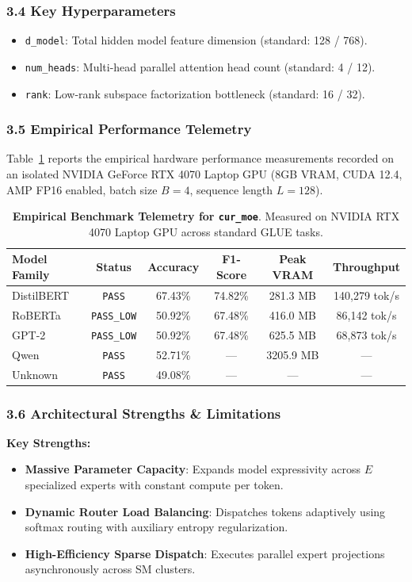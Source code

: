 \subsubsection*{3.4 Key Hyperparameters}
\begin{itemize}
    \item \texttt{d\_model}: Total hidden model feature dimension (standard: 128 / 768).
    \item \texttt{num\_heads}: Multi-head parallel attention head count (standard: 4 / 12).
    \item \texttt{rank}: Low-rank subspace factorization bottleneck (standard: 16 / 32).
\end{itemize}

\subsubsection*{3.5 Empirical Performance Telemetry}
Table~\ref{tab:telemetry_cur_moe} reports the empirical hardware performance measurements recorded on an isolated NVIDIA GeForce RTX 4070 Laptop GPU (8GB VRAM, CUDA 12.4, AMP FP16 enabled, batch size $B=4$, sequence length $L=128$).

\begin{table}[h]
\centering
\small
\caption{\textbf{Empirical Benchmark Telemetry for \texttt{cur\_moe}}. Measured on NVIDIA RTX 4070 Laptop GPU across standard GLUE tasks.}
\label{tab:telemetry_cur_moe}
\begin{tabular*}{\columnwidth}{@{\extracolsep{\fill}}lccccc}
\toprule
\textbf{Model Family} & \textbf{Status} & \textbf{Accuracy} & \textbf{F1-Score} & \textbf{Peak VRAM} & \textbf{Throughput} \\
\midrule
DistilBERT & \texttt{PASS} & 67.43\% & 74.82\% & 281.3 MB & 140,279 tok/s \\
RoBERTa & \texttt{PASS\_LOW} & 50.92\% & 67.48\% & 416.0 MB & 86,142 tok/s \\
GPT-2 & \texttt{PASS\_LOW} & 50.92\% & 67.48\% & 625.5 MB & 68,873 tok/s \\
Qwen & \texttt{PASS} & 52.71\% & --- & 3205.9 MB & --- \\
Unknown & \texttt{PASS} & 49.08\% & --- & --- & --- \\
\bottomrule
\end{tabular*}
\end{table}

\subsubsection*{3.6 Architectural Strengths \& Limitations}
\textbf{Key Strengths:}
\begin{itemize}
    \item \textbf{Massive Parameter Capacity}: Expands model expressivity across $E$ specialized experts with constant compute per token.
    \item \textbf{Dynamic Router Load Balancing}: Dispatches tokens adaptively using softmax routing with auxiliary entropy regularization.
    \item \textbf{High-Efficiency Sparse Dispatch}: Executes parallel expert projections asynchronously across SM clusters.
\end{itemize}

